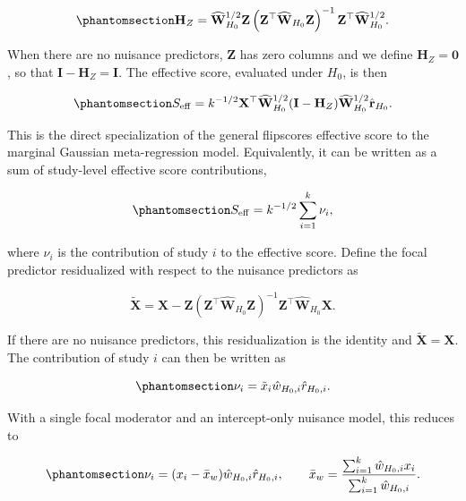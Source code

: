 \documentclass[
  man,
  longtable,
  nolmodern,
  notxfonts,
  notimes,
  colorlinks=true,linkcolor=blue,citecolor=blue,urlcolor=blue]{apa7}
\begin{document}
\begin{equation}\phantomsection\label{eq-hz}{
\mathbf{H}_Z
=
\widehat{\mathbf{W}}_{H_0}^{1/2}
\mathbf{Z}
\left(
\mathbf{Z}^{\top}
\widehat{\mathbf{W}}_{H_0}
\mathbf{Z}
\right)^{-1}
\mathbf{Z}^{\top}
\widehat{\mathbf{W}}_{H_0}^{1/2}.
}\end{equation}

When there are no nuisance predictors, \(\mathbf{Z}\) has zero columns
and we define \(\mathbf{H}_Z=\mathbf{0}\), so that
\(\mathbf{I}-\mathbf{H}_Z=\mathbf{I}\). The effective score, evaluated
under \(H_0\), is then

\begin{equation}\phantomsection\label{eq-effective-score-observed}{
S_{\mathrm{eff}}
=
k^{-1/2}
\mathbf{X}^{\top}
\widehat{\mathbf{W}}_{H_0}^{1/2}
(\mathbf{I}-\mathbf{H}_Z)
\widehat{\mathbf{W}}_{H_0}^{1/2}
\hat{\mathbf{r}}_{H_0}.
}\end{equation}

This is the direct specialization of the general flipscores effective
score to the marginal Gaussian meta-regression model. Equivalently, it
can be written as a sum of study-level effective score contributions,

\begin{equation}\phantomsection\label{eq-score-contributions-observed}{
S_{\mathrm{eff}}
=
k^{-1/2}
\sum_{i=1}^{k}
\nu_i,
}\end{equation}

where \(\nu_i\) is the contribution of study \(i\) to the effective
score. Define the focal predictor residualized with respect to the
nuisance predictors as

\[
\widetilde{\mathbf{X}}
=
\mathbf{X}
-
\mathbf{Z}
\left(
\mathbf{Z}^{\top}
\widehat{\mathbf{W}}_{H_0}
\mathbf{Z}
\right)^{-1}
\mathbf{Z}^{\top}
\widehat{\mathbf{W}}_{H_0}
\mathbf{X}.
\]

If there are no nuisance predictors, this residualization is the
identity and \(\widetilde{\mathbf{X}}=\mathbf{X}\). The contribution of
study \(i\) can then be written as

\begin{equation}\phantomsection\label{eq-score-contribution-general}{
\nu_i
=
\tilde{x}_i
\hat{w}_{H_0,i}
\hat{r}_{H_0,i}.
}\end{equation}

With a single focal moderator and an intercept-only nuisance model, this
reduces to

\begin{equation}\phantomsection\label{eq-simple-contribution}{
\nu_i
=
(x_i-\bar{x}_w)
\hat{w}_{H_0,i}
\hat{r}_{H_0,i},
\qquad
\bar{x}_w
=
\frac{\sum_{i=1}^{k}\hat{w}_{H_0,i}x_i}{\sum_{i=1}^{k}\hat{w}_{H_0,i}}.
}\end{equation}
\end{document}
